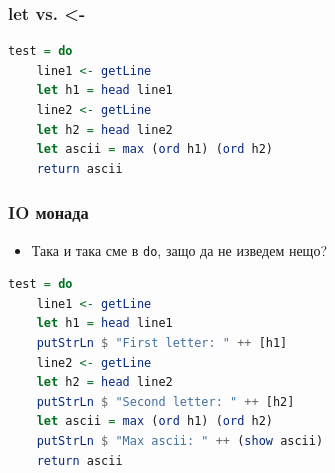 \documentclass{beamer}
\begin{document}
\begin{frame}[fragile]
  \frametitle{let vs. <-}
\begin{lstlisting}[language=Haskell]
test = do
    line1 <- getLine
    let h1 = head line1
    line2 <- getLine
    let h2 = head line2
    let ascii = max (ord h1) (ord h2)
    return ascii
\end{lstlisting}
\end{frame}



\begin{frame}[fragile]
  \frametitle{IO монада}
\begin{itemize}
  \item Така и така сме в \verb#do#, защо да не изведем нещо?
\end{itemize}
\begin{lstlisting}[basicstyle=\small,language=Haskell]
test = do
    line1 <- getLine
    let h1 = head line1
    putStrLn $ "First letter: " ++ [h1]
    line2 <- getLine
    let h2 = head line2
    putStrLn $ "Second letter: " ++ [h2]
    let ascii = max (ord h1) (ord h2)
    putStrLn $ "Max ascii: " ++ (show ascii)
    return ascii
\end{lstlisting}
\end{frame}







\end{document}
